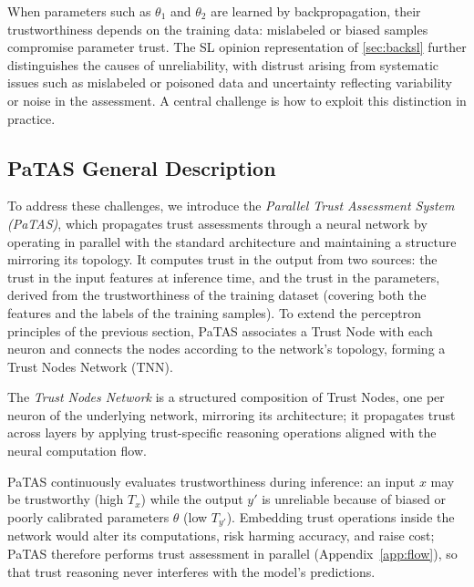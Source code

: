 When parameters such as \( \theta_1 \) and \( \theta_2 \) are learned by backpropagation, their trustworthiness depends on the training data: mislabeled or biased samples compromise parameter trust. The SL opinion representation of \cref{sec:backsl} further distinguishes the causes of unreliability, with distrust arising from systematic issues such as mislabeled or poisoned data and uncertainty reflecting variability or noise in the assessment. A central challenge is how to exploit this distinction in practice.

\vspace{-0.5em}
\subsection{PaTAS General Description}

To address these challenges, we introduce the \emph{Parallel Trust Assessment System (PaTAS)}, which propagates trust assessments through a neural network by operating in parallel with the standard architecture and maintaining a structure mirroring its topology. It computes trust in the output from two sources: the trust in the input features at inference time, and the trust in the parameters, derived from the trustworthiness of the training dataset (covering both the features and the labels of the training samples). To extend the perceptron principles of the previous section, PaTAS associates a Trust Node with each neuron and connects the nodes according to the network's topology, forming a Trust Nodes Network (TNN).
\begin{definition}
The \emph{Trust Nodes Network} is a structured composition of Trust Nodes, one per neuron of the underlying network, mirroring its architecture; it propagates trust across layers by applying trust-specific reasoning operations aligned with the neural computation flow.
\end{definition}

PaTAS continuously evaluates trustworthiness during inference: an input \(x\) may be trustworthy (high \(T_x\)) while the output \(y\prime\) is unreliable because of biased or poorly calibrated parameters \(\theta\) (low \(T_{y\prime}\)). Embedding trust operations inside the network would alter its computations, risk harming accuracy, and raise cost; PaTAS therefore performs trust assessment in parallel (Appendix~\ref{app:flow}), so that trust reasoning never interferes with the model's predictions.
